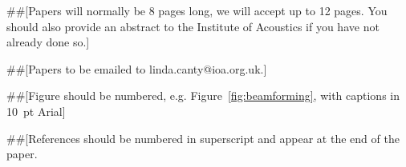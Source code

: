 \documentclass[10pt, a4paper, oneside]{article}
\begin{document}
\#\#[Papers will normally be 8 pages long, we will accept up to 12 pages. You should also provide an abstract to the Institute of Acoustics if you have not already done so.]

\#\#[Papers to be emailed to linda.canty@ioa.org.uk.]

\#\#[Figure should be numbered, e.g. Figure~\ref{fig:beamforming}, with captions in 10~pt Arial]

\#\#[References should be numbered in superscript and appear at the end of the paper\cite{Mareze-2019,Steeneken,cox2001extracting,Haykin,arial}.


\renewcommand{\refname}{References} \renewcommand{\bibname}{References} 


%
%
\end{document}
